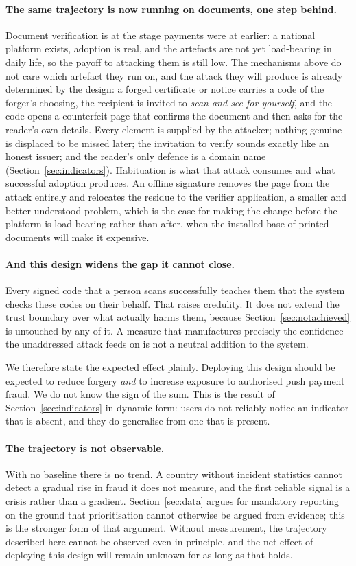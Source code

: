 \documentclass[10pt,a4paper,twocolumn]{article}
\begin{document}
\paragraph{The same trajectory is now running on documents, one step behind.}
Document verification is at the stage payments were at earlier: a national
platform exists, adoption is real, and the artefacts are not yet load-bearing
in daily life, so the payoff to attacking them is still low. The mechanisms
above do not care which artefact they run on, and the attack they will produce
is already determined by the design: a forged certificate or notice carries a
code of the forger's choosing, the recipient is invited to \emph{scan and see
for yourself}, and the code opens a counterfeit page that confirms the document
and then asks for the reader's own details. Every element is supplied by the
attacker; nothing genuine is displaced to be missed later; the invitation to
verify sounds exactly like an honest issuer; and the reader's only defence is a
domain name (Section~\ref{sec:indicators}). Habituation is what that attack
consumes and what successful adoption produces. An offline signature removes
the page from the attack entirely and relocates the residue to the verifier
application, a smaller and better-understood problem, which is the case for
making the change before the platform is load-bearing rather than after, when
the installed base of printed documents will make it expensive.

\paragraph{And this design widens the gap it cannot close.}
Every signed code that a person scans successfully teaches them that the system
checks these codes on their behalf. That raises credulity. It does not extend
the trust boundary over what actually harms them, because
Section~\ref{sec:notachieved} is untouched by any of it. A measure that
manufactures precisely the confidence the unaddressed attack feeds on is not a
neutral addition to the system.

We therefore state the expected effect plainly. Deploying this design should be
expected to reduce forgery \emph{and} to increase exposure to authorised push
payment fraud. We do not know the sign of the sum. This is the result of
Section~\ref{sec:indicators} in dynamic form: users do not reliably notice an
indicator that is absent, and they do generalise from one that is present.

\paragraph{The trajectory is not observable.}
With no baseline there is no trend. A country without incident statistics cannot
detect a gradual rise in fraud it does not measure, and the first reliable signal
is a crisis rather than a gradient. Section~\ref{sec:data} argues for mandatory
reporting on the ground that prioritisation cannot otherwise be argued from
evidence; this is the stronger form of that argument. Without measurement, the
trajectory described here cannot be observed even in principle, and the net
effect of deploying this design will remain unknown for as long as that holds.
\end{document}
